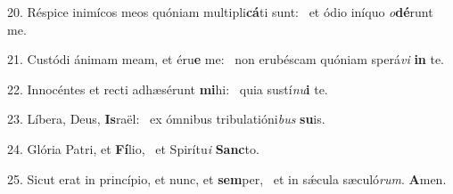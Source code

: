 20. Réspice inimícos meos quóniam multipli\textbf{cá}ti sunt: \ast\  et ódio iníquo \textit{o}\textbf{dé}runt me.\

21. Custódi ánimam meam, et éru\textbf{e} me: \ast\  non erubéscam quóniam sperá\textit{vi} \textbf{in} te.\

22. Innocéntes et recti adhæsérunt \textbf{mi}hi: \ast\  quia sustí\textit{nu}\textbf{i} te.\

23. Líbera, Deus, \textbf{Is}raël: \ast\  ex ómnibus tribulatióni\textit{bus} \textbf{su}is.\

24. Glória Patri, et \textbf{Fí}lio, \ast\  et Spirítu\textit{i} \textbf{Sanc}to.\

25. Sicut erat in princípio, et nunc, et \textbf{sem}per, \ast\  et in sǽcula sæculó\textit{rum}. \textbf{A}men.\

